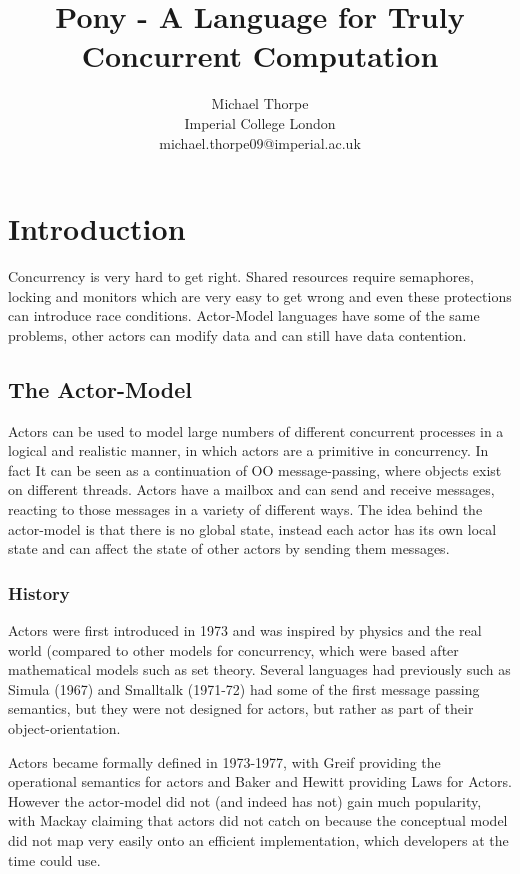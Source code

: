 \documentclass{article}
\begin{document}
\title{Pony - A Language for Truly Concurrent Computation}

\author{ 	Michael Thorpe\\
		Imperial College London\\
		michael.thorpe09@imperial.ac.uk}
\maketitle
\tableofcontents

\section{Introduction}

Concurrency is very hard to get right. Shared resources require
semaphores, locking and monitors which are very easy to get wrong
and even these protections can introduce race conditions. 
Actor-Model languages have some of the same problems, other
actors can modify data and can still have data contention.

\subsection{The Actor-Model}

Actors can be used to model large numbers of different concurrent processes in a
logical and realistic manner, in which actors are a primitive in concurrency. In
fact It can be seen as a continuation of OO message-passing, where objects exist
on different threads. Actors have a mailbox and can send and receive messages,
reacting to those messages in a variety of different ways. The idea behind the
actor-model is that there is no global state, instead each actor has its own
local state and can affect the state of other actors by sending them messages.

\subsubsection{History}

Actors were first introduced in 1973\cite{hewitt1973} and was inspired by
physics and the real world (compared to other models for concurrency, which were
based after mathematical models such as set theory. Several languages had
previously such as Simula (1967) and Smalltalk (1971-72) had some of the first
message passing semantics, but they were not designed for actors, but rather as
part of their object-orientation.

Actors became formally defined in 1973-1977, with Greif providing the
operational semantics for actors\cite{grief1975} and Baker and Hewitt providing
Laws for Actors\cite{hewitt1977}. However the actor-model did not (and
indeed has not) gain much popularity, with Mackay\cite{mackay97} claiming that
actors did not catch on because the conceptual model did not map very easily
onto an efficient implementation, which developers at the time could use.
\end{document}
